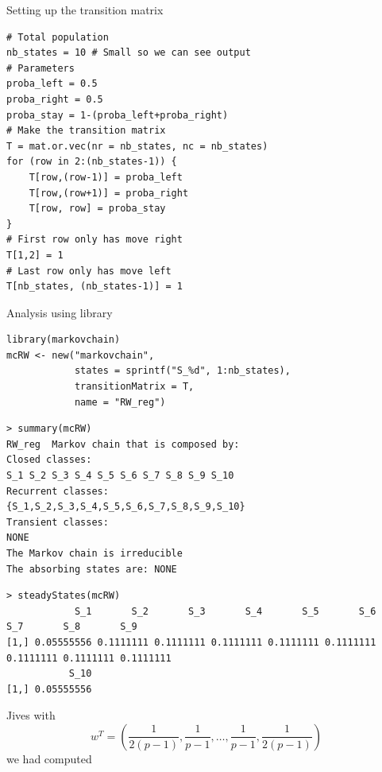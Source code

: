 \documentclass[aspectratio=43]{beamer}
\begin{document}
\begin{frame}[fragile]{Setting up the transition matrix}
\begin{lstlisting}[language=Renhanced]
# Total population
nb_states = 10 # Small so we can see output
# Parameters
proba_left = 0.5
proba_right = 0.5
proba_stay = 1-(proba_left+proba_right)
# Make the transition matrix
T = mat.or.vec(nr = nb_states, nc = nb_states)
for (row in 2:(nb_states-1)) {
    T[row,(row-1)] = proba_left
    T[row,(row+1)] = proba_right
    T[row, row] = proba_stay
}
# First row only has move right
T[1,2] = 1
# Last row only has move left
T[nb_states, (nb_states-1)] = 1
\end{lstlisting}
\end{frame}

\begin{frame}[fragile]{Analysis using  library}
\begin{lstlisting}[language=Renhanced]
library(markovchain)
mcRW <- new("markovchain", 
            states = sprintf("S_%d", 1:nb_states),
            transitionMatrix = T,
            name = "RW_reg")
\end{lstlisting}
\vfill
\begin{lstlisting}
> summary(mcRW)
RW_reg  Markov chain that is composed by: 
Closed classes: 
S_1 S_2 S_3 S_4 S_5 S_6 S_7 S_8 S_9 S_10 
Recurrent classes: 
{S_1,S_2,S_3,S_4,S_5,S_6,S_7,S_8,S_9,S_10}
Transient classes: 
NONE 
The Markov chain is irreducible 
The absorbing states are: NONE
\end{lstlisting}
\end{frame}


\begin{frame}[fragile]
\begin{lstlisting}
> steadyStates(mcRW)
            S_1       S_2       S_3       S_4       S_5       S_6       S_7       S_8       S_9
[1,] 0.05555556 0.1111111 0.1111111 0.1111111 0.1111111 0.1111111 0.1111111 0.1111111 0.1111111
           S_10
[1,] 0.05555556
\end{lstlisting}
\vfill
Jives with 
$$
w^T=\left(\frac{1}{2(p-1)},\frac{1}{p-1},\ldots,\frac{1}{p-1},\frac{1}{2(p-1)}\right)
$$
we had computed
\end{frame}
\end{document}
